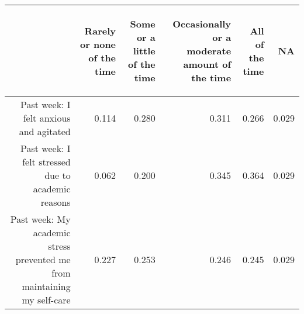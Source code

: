 \documentclass{article}\usepackage[]{graphicx}\usepackage[]{color}
\begin{document}
\begin{table}[ht]
\centering
\begin{tabular}{rrrrrr}
  \hline
 & \begin{sideways} Rarely or none of the time \end{sideways} & \begin{sideways} Some or a little of the time \end{sideways} & \begin{sideways} Occasionally or a moderate amount of the time \end{sideways} & \begin{sideways} All of the time \end{sideways} & \begin{sideways} NA \end{sideways} \\ 
  \hline
Past week: I felt anxious and agitated & 0.114 & 0.280 & 0.311 & 0.266 & 0.029 \\ 
  	Past week: I felt stressed due to academic reasons & 0.062 & 0.200 & 0.345 & 0.364 & 0.029 \\ 
  Past week: My academic stress prevented me from maintaining my self-care & 0.227 & 0.253 & 0.246 & 0.245 & 0.029 \\ 
   \hline
\end{tabular}
\end{table}


\newpage
\end{document}
